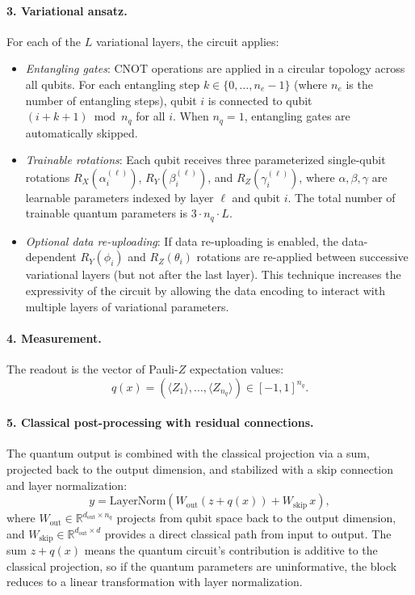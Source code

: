 \documentclass[11pt]{article}
\begin{document}
\paragraph{3. Variational ansatz.}
For each of the $L$ variational layers, the circuit applies:
\begin{itemize}
  \item \emph{Entangling gates}: CNOT operations are applied in a circular topology across all qubits. For each entangling step $k \in \{0, \ldots, n_e - 1\}$ (where $n_e$ is the number of entangling steps), qubit $i$ is connected to qubit $(i + k + 1) \bmod n_q$ for all $i$. When $n_q = 1$, entangling gates are automatically skipped.
  \item \emph{Trainable rotations}: Each qubit receives three parameterized single-qubit rotations $R_X(\alpha_i^{(\ell)})$, $R_Y(\beta_i^{(\ell)})$, and $R_Z(\gamma_i^{(\ell)})$, where $\alpha, \beta, \gamma$ are learnable parameters indexed by layer $\ell$ and qubit $i$. The total number of trainable quantum parameters is $3 \cdot n_q \cdot L$.
  \item \emph{Optional data re-uploading}: If data re-uploading is enabled, the data-dependent $R_Y(\phi_i)$ and $R_Z(\theta_i)$ rotations are re-applied between successive variational layers (but not after the last layer). This technique increases the expressivity of the circuit by allowing the data encoding to interact with multiple layers of variational parameters.
\end{itemize}

\paragraph{4. Measurement.}
The readout is the vector of Pauli-$Z$ expectation values:
\[
q(x) = \left(\langle Z_1 \rangle, \ldots, \langle Z_{n_q} \rangle\right) \in [-1, 1]^{n_q}.
\]

\paragraph{5. Classical post-processing with residual connections.}
The quantum output is combined with the classical projection via a sum, projected back to the output dimension, and stabilized with a skip connection and layer normalization:
\[
y = \mathrm{LayerNorm}\!\left(W_{\text{out}}(z + q(x)) + W_{\text{skip}} \, x\right),
\]
where $W_{\text{out}} \in \mathbb{R}^{d_\text{out} \times n_q}$ projects from qubit space back to the output dimension, and $W_{\text{skip}} \in \mathbb{R}^{d_\text{out} \times d}$ provides a direct classical path from input to output. The sum $z + q(x)$ means the quantum circuit's contribution is additive to the classical projection, so if the quantum parameters are uninformative, the block reduces to a linear transformation with layer normalization.
\end{document}
